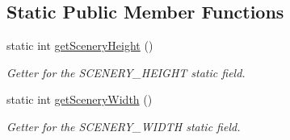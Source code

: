 \subsection*{Static Public Member Functions}
\begin{DoxyCompactItemize}
\item 
static int \hyperlink{classworld_1_1scenery_1_1_scenery_ad49a4c8ba7e7c464b49b30efea953a66}{get\-Scenery\-Height} ()
\begin{DoxyCompactList}\small\item\em Getter for the S\-C\-E\-N\-E\-R\-Y\-\_\-\-H\-E\-I\-G\-H\-T static field. \end{DoxyCompactList}\item 
static int \hyperlink{classworld_1_1scenery_1_1_scenery_ab0ba1fc1e7266f25ac7b1b7d36d2b5b8}{get\-Scenery\-Width} ()
\begin{DoxyCompactList}\small\item\em Getter for the S\-C\-E\-N\-E\-R\-Y\-\_\-\-W\-I\-D\-T\-H static field. \end{DoxyCompactList}\end{DoxyCompactItemize}
